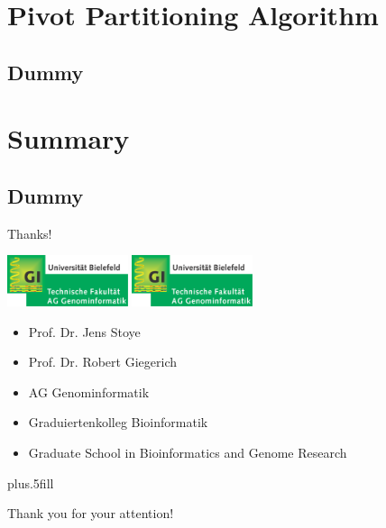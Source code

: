 \documentclass{beamer}
\begin{document}

\section[Pivot Partitioning]{Pivot Partitioning Algorithm}
\subsection{Dummy}


\section*{Summary}
\subsection*{Dummy}


\begin{frame}{Thanks!}

  \centerline{
    \includegraphics[height=1.5cm]{aggi_logo.png}
    \hspace*{2cm}
    \includegraphics[height=1.5cm]{aggi_logo.png}
  }

  \vspace*{0.5cm}
  \begin{itemize}
    \item Prof. Dr. Jens Stoye
    \item Prof. Dr. Robert Giegerich
    \item AG Genominformatik
    \item Graduiertenkolleg Bioinformatik
    \item Graduate School in Bioinformatics and Genome Research
  \end{itemize}
  
  \vskip0pt plus.5fill
  \centerline{\alert{Thank you for your attention!}}
  
\end{frame}
\end{document}
